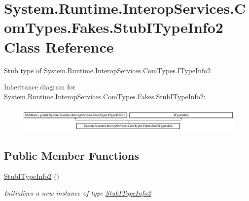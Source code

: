 \hypertarget{class_system_1_1_runtime_1_1_interop_services_1_1_com_types_1_1_fakes_1_1_stub_i_type_info2}{\section{System.\-Runtime.\-Interop\-Services.\-Com\-Types.\-Fakes.\-Stub\-I\-Type\-Info2 Class Reference}
\label{class_system_1_1_runtime_1_1_interop_services_1_1_com_types_1_1_fakes_1_1_stub_i_type_info2}
}


Stub type of System.\-Runtime.\-Interop\-Services.\-Com\-Types.\-I\-Type\-Info2 


Inheritance diagram for System.\-Runtime.\-Interop\-Services.\-Com\-Types.\-Fakes.\-Stub\-I\-Type\-Info2\-:\begin{figure}[H]
\begin{center}
\leavevmode
\includegraphics[height=1.266968cm]{class_system_1_1_runtime_1_1_interop_services_1_1_com_types_1_1_fakes_1_1_stub_i_type_info2}
\end{center}
\end{figure}
\subsection*{Public Member Functions}
\begin{DoxyCompactItemize}
\item 
\hyperlink{class_system_1_1_runtime_1_1_interop_services_1_1_com_types_1_1_fakes_1_1_stub_i_type_info2_ac2a576974ef02b2d479895f3630a3571}{Stub\-I\-Type\-Info2} ()
\begin{DoxyCompactList}\small\item\em Initializes a new instance of type \hyperlink{class_system_1_1_runtime_1_1_interop_services_1_1_com_types_1_1_fakes_1_1_stub_i_type_info2}{Stub\-I\-Type\-Info2}\end{DoxyCompactList}\end{DoxyCompactItemize}

